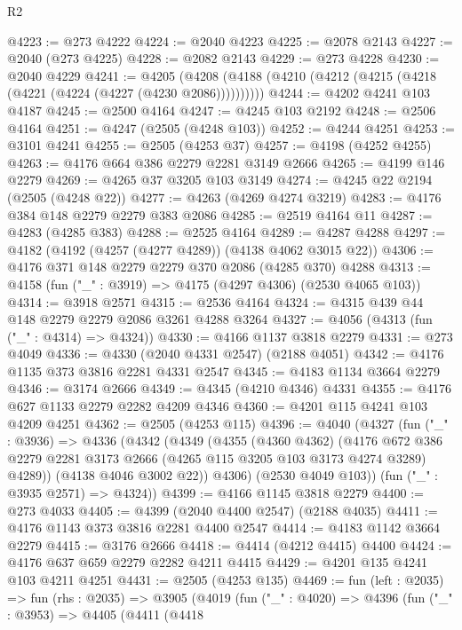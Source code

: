 \begin{lexlean}{R2}
\begin{coremodule}
@4223 := @273 @4222
@4224 := @2040 @4223
@4225 := @2078 @2143
@4227 := @2040 (@273 @4225)
@4228 := @2082 @2143
@4229 := @273 @4228
@4230 := @2040 @4229
@4241 := @4205 (@4208 (@4188 (@4210 (@4212 (@4215 (@4218 (@4221 (@4224 (@4227 (@4230 @2086))))))))))
@4244 := @4202 @4241 @103 @4187
@4245 := @2500 @4164
@4247 := @4245 @103 @2192
@4248 := @2506 @4164
@4251 := @4247 (@2505 (@4248 @103))
@4252 := @4244 @4251
@4253 := @3101 @4241
@4255 := @2505 (@4253 @37)
@4257 := @4198 (@4252 @4255)
@4263 := @4176 @664 @386 @2279 @2281 @3149 @2666
@4265 := @4199 @146 @2279
@4269 := @4265 @37 @3205 @103 @3149
@4274 := @4245 @22 @2194 (@2505 (@4248 @22))
@4277 := @4263 (@4269 @4274 @3219)
@4283 := @4176 @384 @148 @2279 @2279 @383 @2086
@4285 := @2519 @4164 @11
@4287 := @4283 (@4285 @383)
@4288 := @2525 @4164
@4289 := @4287 @4288
@4297 := @4182 (@4192 (@4257 (@4277 @4289)) (@4138 @4062 @3015 @22))
@4306 := @4176 @371 @148 @2279 @2279 @370 @2086 (@4285 @370) @4288
@4313 := @4158 (fun ("_" : @3919) => @4175 (@4297 @4306) (@2530 @4065 @103))
@4314 := @3918 @2571
@4315 := @2536 @4164
@4324 := @4315 @439 @44 @148 @2279 @2279 @2086 @3261 @4288 @3264
@4327 := @4056 (@4313 (fun ("_" : @4314) => @4324))
@4330 := @4166 @1137 @3818 @2279
@4331 := @273 @4049
@4336 := @4330 (@2040 @4331 @2547) (@2188 @4051)
@4342 := @4176 @1135 @373 @3816 @2281 @4331 @2547
@4345 := @4183 @1134 @3664 @2279
@4346 := @3174 @2666
@4349 := @4345 (@4210 @4346) @4331
@4355 := @4176 @627 @1133 @2279 @2282 @4209 @4346
@4360 := @4201 @115 @4241 @103 @4209 @4251
@4362 := @2505 (@4253 @115)
@4396 := @4040
    (@4327
      (fun ("_" : @3936) =>
      @4336
        (@4342
          (@4349
            (@4355
              (@4360 @4362)
              (@4176
                @672
                @386
                @2279
                @2281
                @3173
                @2666
                (@4265 @115 @3205 @103 @3173 @4274 @3289)
                @4289))
            (@4138 @4046 @3002 @22))
          @4306)
        (@2530 @4049 @103))
      (fun ("_" : @3935 @2571) => @4324))
@4399 := @4166 @1145 @3818 @2279
@4400 := @273 @4033
@4405 := @4399 (@2040 @4400 @2547) (@2188 @4035)
@4411 := @4176 @1143 @373 @3816 @2281 @4400 @2547
@4414 := @4183 @1142 @3664 @2279
@4415 := @3176 @2666
@4418 := @4414 (@4212 @4415) @4400
@4424 := @4176 @637 @659 @2279 @2282 @4211 @4415
@4429 := @4201 @135 @4241 @103 @4211 @4251
@4431 := @2505 (@4253 @135)
@4469 := fun (left : @2035) =>
  fun (rhs : @2035) =>
  @3905
    (@4019
      (fun ("_" : @4020) =>
      @4396
        (fun ("_" : @3953) =>
        @4405
          (@4411
            (@4418

\end{coremodule}
\end{lexlean}
